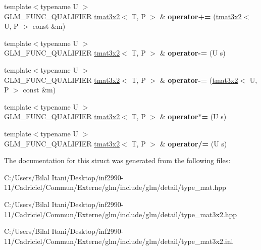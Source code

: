 \begin{DoxyCompactItemize}
\item 
{\footnotesize template$<$typename U $>$ }\\G\+L\+M\+\_\+\+F\+U\+N\+C\+\_\+\+Q\+U\+A\+L\+I\+F\+I\+ER \hyperlink{structglm_1_1detail_1_1tmat3x2}{tmat3x2}$<$ T, P $>$ \& {\bfseries operator+=} (\hyperlink{structglm_1_1detail_1_1tmat3x2}{tmat3x2}$<$ U, P $>$ const \&m)\hypertarget{structglm_1_1detail_1_1tmat3x2_aeb063f61f41be8039bf8e5b40b40ae50}{}\label{structglm_1_1detail_1_1tmat3x2_aeb063f61f41be8039bf8e5b40b40ae50}

\item 
{\footnotesize template$<$typename U $>$ }\\G\+L\+M\+\_\+\+F\+U\+N\+C\+\_\+\+Q\+U\+A\+L\+I\+F\+I\+ER \hyperlink{structglm_1_1detail_1_1tmat3x2}{tmat3x2}$<$ T, P $>$ \& {\bfseries operator-\/=} (U s)\hypertarget{structglm_1_1detail_1_1tmat3x2_af77215fb32bc46ef8b32f044ef9bdab6}{}\label{structglm_1_1detail_1_1tmat3x2_af77215fb32bc46ef8b32f044ef9bdab6}

\item 
{\footnotesize template$<$typename U $>$ }\\G\+L\+M\+\_\+\+F\+U\+N\+C\+\_\+\+Q\+U\+A\+L\+I\+F\+I\+ER \hyperlink{structglm_1_1detail_1_1tmat3x2}{tmat3x2}$<$ T, P $>$ \& {\bfseries operator-\/=} (\hyperlink{structglm_1_1detail_1_1tmat3x2}{tmat3x2}$<$ U, P $>$ const \&m)\hypertarget{structglm_1_1detail_1_1tmat3x2_a27015cfc43f110539d46ab697ce67d4b}{}\label{structglm_1_1detail_1_1tmat3x2_a27015cfc43f110539d46ab697ce67d4b}

\item 
{\footnotesize template$<$typename U $>$ }\\G\+L\+M\+\_\+\+F\+U\+N\+C\+\_\+\+Q\+U\+A\+L\+I\+F\+I\+ER \hyperlink{structglm_1_1detail_1_1tmat3x2}{tmat3x2}$<$ T, P $>$ \& {\bfseries operator$\ast$=} (U s)\hypertarget{structglm_1_1detail_1_1tmat3x2_af59d2d25557d16f13ff7fd79fa94bfd0}{}\label{structglm_1_1detail_1_1tmat3x2_af59d2d25557d16f13ff7fd79fa94bfd0}

\item 
{\footnotesize template$<$typename U $>$ }\\G\+L\+M\+\_\+\+F\+U\+N\+C\+\_\+\+Q\+U\+A\+L\+I\+F\+I\+ER \hyperlink{structglm_1_1detail_1_1tmat3x2}{tmat3x2}$<$ T, P $>$ \& {\bfseries operator/=} (U s)\hypertarget{structglm_1_1detail_1_1tmat3x2_ab8db479d66f6b4cac2c02b9e5a2e40d8}{}\label{structglm_1_1detail_1_1tmat3x2_ab8db479d66f6b4cac2c02b9e5a2e40d8}

\end{DoxyCompactItemize}


The documentation for this struct was generated from the following files\+:\begin{DoxyCompactItemize}
\item 
C\+:/\+Users/\+Bilal Itani/\+Desktop/inf2990-\/11/\+Cadriciel/\+Commun/\+Externe/glm/include/glm/detail/type\+\_\+mat.\+hpp\item 
C\+:/\+Users/\+Bilal Itani/\+Desktop/inf2990-\/11/\+Cadriciel/\+Commun/\+Externe/glm/include/glm/detail/type\+\_\+mat3x2.\+hpp\item 
C\+:/\+Users/\+Bilal Itani/\+Desktop/inf2990-\/11/\+Cadriciel/\+Commun/\+Externe/glm/include/glm/detail/type\+\_\+mat3x2.\+inl\end{DoxyCompactItemize}
